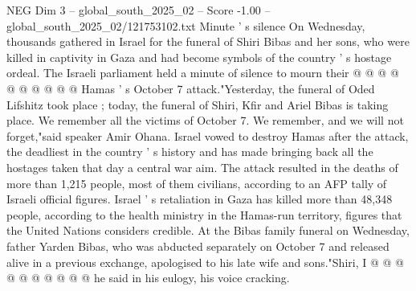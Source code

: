 \begin{textsample}{NEG Dim 3 – global\_south\_2025\_02 – Score -1.00 – global\_south\_2025\_02/121753102.txt}
Minute ' s silence On Wednesday, thousands gathered in Israel for the funeral of Shiri Bibas and her sons, who were killed in captivity in Gaza and had become symbols of the country ' s hostage ordeal.
The Israeli parliament held a minute of silence to mourn their @ @ @ @ @ @ @ @ @ @ Hamas ' s October 7 attack."Yesterday, the funeral of Oded Lifshitz took place ; today, the funeral of Shiri, Kfir and Ariel Bibas is taking place.
We remember all the victims of October 7.
We remember, and we will not forget,"said speaker Amir Ohana.
Israel vowed to destroy Hamas after the attack, the deadliest in the country ' s history and has made bringing back all the hostages taken that day a central war aim.
The attack resulted in the deaths of more than 1,215 people, most of them civilians, according to an AFP tally of Israeli official figures.
Israel ' s retaliation in Gaza has killed more than 48,348 people, according to the health ministry in the Hamas-run territory, figures that the United Nations considers credible.
At the Bibas family funeral on Wednesday, father Yarden Bibas, who was abducted separately on October 7 and released alive in a previous exchange, apologised to his late wife and sons."Shiri, I @ @ @ @ @ @ @ @ @ @ he said in his eulogy, his voice cracking.

\end{textsample}
